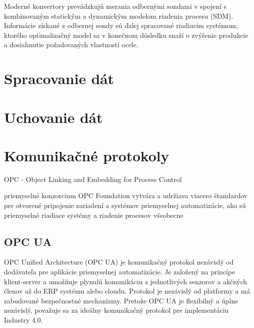 \documentclass[]{tukediphc}
\begin{document}
Moderné konvertory prevádzkujú merania odbernými sondami v spojení s kombinovaným statickým a dynamickým modelom riadenia procesu (SDM). Informácie získané z odbernej sondy sú ďalej spracované riadiacim systémom, ktorého optimalizačný model sa v konečnom dôsledku snaží o zvýšenie produkcie a dosiahnutie požadovaných vlastností ocele.

\section{Spracovanie dát}

\section{Uchovanie dát}


\section{Komunikačné protokoly}

OPC - Object Linking and Embedding for Process Control

priemyselné konzorcium OPC Foundation vytvára a udržiava viacero štandardov pre otvorené pripojenie zariadení a systémov priemyselnej automatizácie, ako sú priemyselné riadiace systémy a riadenie procesov všeobecne

\subsection{OPC UA}
 

OPC Unified Architecture (OPC UA) je komunikačný protokol nezávislý od dodávateľa pre aplikácie priemyselnej automatizácie. Je založený na princípe klient-server a umožňuje plynulú komunikáciu z jednotlivých senzorov a akčných členov až do ERP systému alebo cloudu. Protokol je nezávislý od platformy a má zabudované bezpečnostné mechanizmy. Pretože OPC UA je flexibilný a úplne nezávislý, považuje sa za ideálny komunikačný protokol pre implementáciu Industry 4.0.
\end{document}

